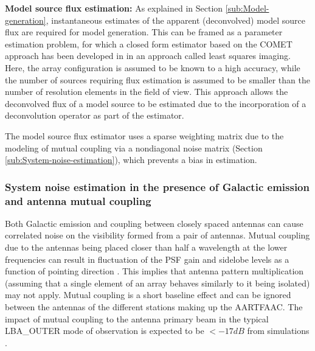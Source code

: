 \documentclass[referee]{aa}
\begin{document}
\textbf{Model    source   flux    estimation:}   As    explained    in   Section
\ref{sub:Model-generation},    instantaneous   estimates    of    the   apparent
(deconvolved) model source flux are  required for model generation.  This can be
framed  as a parameter  estimation problem,  for which  a closed  form estimator
based     on     the     COMET     approach    has     been     developed     in
\citep{wijnholds2008fundamental}  in an approach  called least  squares imaging.
Here, the array  configuration is assumed to be known to  a high accuracy, while
the number  of sources requiring flux  estimation is assumed to  be smaller than
the number  of resolution elements in  the field of view.   This approach allows
the deconvolved flux of a model source to be estimated due to the incorporation
of a deconvolution operator as part of the estimator.


  The model  source flux estimator uses a  sparse weighting matrix
due to the modeling of mutual  coupling via a nondiagonal noise matrix (Section
\ref{sub:System-noise-estimation}), which prevents a bias in estimation.

\subsubsection{\label{sub:System-noise-estimation}System noise estimation in the
presence of Galactic emission and antenna mutual coupling}

Both Galactic  emission and coupling  between closely spaced antennas  can cause
correlated  noise on  the  visibility formed  from  a pair  of antennas.  Mutual
coupling due to  the antennas being placed closer than half  a wavelength at the
lower frequencies can result in fluctuation  of the PSF gain and sidelobe levels
as  a function  of pointing  direction \citep{agrawal1972mutual}.   This implies
that antenna pattern multiplication (assuming  that a single element of an array
behaves similarly  to it being  isolated) may not  apply.  Mutual coupling  is a
short baseline effect and can be  ignored between the antennas of the different
stations making  up the AARTFAAC. The  impact of mutual coupling  to the antenna
primary beam  in the typical  LBA\_OUTER mode of  observation is expected  to be
$<-17dB$ from simulations \citep{wijnholds2011situ}.
\end{document}
